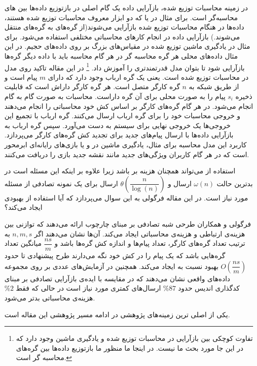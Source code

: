 \begin{enumerate}
در زمینه محاسبات توزیع شده، بازآرایی داده یک گام اصلی در بازتوزیع داده‌ها بین 
های محاسبه‌گر است. برای مثال در
یا
که دو ابزار معروف محاسبات توزیع شده هستند، داده‌ها در هنگام محاسبات توزیع شده بازآرایی می‌شوند(از گره‌های 
 به گره‌های 
 منتقل می‌شوند.) بازآرایی داده در انجام کارهای محاسباتی مختلفی استفاده می‌شود. برای مثال در یادگیری ماشین توزیع شده در مقیاس‌های بزرگ بر روی داده‌های حجیم. در این مثال داده‌های محلی هر گره محاسبه گر در هر گام محاسبه باید با داده دیگر گره‌ها بازآرایی شود تا بتوان مدل قدرتمندتری را آموزش داد.
 \footnote{
 تفاوت کوچکی بین بازآرایی در محاسبات توزیع شده و یادگیری ماشین وجود دارد که در این جا مورد بحث ما نیست. در اینجا ما منظور ما بازتوزیع داده‌ها بین گره‌های محاسبه گر است.
 }
 در این مقاله تاکید روی مدل
 در محاسبات توزیع شده است. یعنی یک گره ارباب وجود دارد که دارای
 $m$
 پیام است و از طریق شبکه به
 $n$
 گره کارگر متصل است. هر گره کارگر داراش
 است که قابلیت ذخیره
 $s_i$
پیام را به صورت محلی برای آن گره داراست. محاسبات به صورت گام به گام انجام می‌شود. در هر گام گره‌های کارگر بر اساس کش خود محاسباتی را انجام می‌دهند و خروجی محاسبات خود را برای گره ارباب ارسال می‌کنند. گره ارباب با تجمیع این خروجی‌ها یک خروجی نهایی برای سیستم به دست می‌آورد. سپس گره ارباب به بازآرایی داده‌ها با ارسال پیام‌های جدید برای تجدید کش گره‌های کارگر می‌پردازد. کاربرد این مدل محاسبه برای مثال، یادگیری ماشین در 
و یا بازی‌های رایانه‌ای ابرمحور است که در هر گام کاربران ویژگی‌های جدید مانند نقشه جدید بازی را دریافت می‌کنند.

استفاده از 
\icod
می‌تواند همچنان هزینه بر باشد زیرا علاوه بر اینکه این مسئله
\nphard
است در بدترین حالت
$\omega(n)$
ارسال و 
$\theta(\dfrac{n}{\log(n)})$
ارسال برای یک نمونه تصادفی از مسئله مورد نیاز است. در این مقاله فرگولی به این سوال می‌پردازد که آیا استفاده از 
\picod
بهبودی ایجاد می‌کند؟

فرگولی و همکاران طرحی شبه تصادفی بر مبنای چارچوب
\picod
ارائه می‌دهند که توازنی بین هزینه‌ی ارتباطی و هزینه‌ی محاسباتی ایجاد می‌کند. آن‌ها نشان می‌دهند اگر
$n, m, s$
به ترتیب تعداد گره‌های کارگر، تعداد پیام‌ها و اندازه کش گره‌ها باشد و
$\dfrac{ns}{m}$
میانگین تعداد گره‌هایی باشد که یک پیام را در کش خود نگه می‌دارند طرح پیشنهادی تا حدود
$O(\dfrac{ns}{m})$
بهبود نسبت به 
\icod
ایجاد می‌کند. همچنین در آزمایش‌های عددی بر روی مجموعه داده‌های واقعی نشان می‌دهند که در مقایسه با ایده‌‌ی بازآرایی تصادفی بر مبنای کدگذاری اندیس حدود
$\%87$
ارسال‌های کمتری مورد نیاز است در حالی که فقط
$\%2$
هزینه‌ی محاسباتی بدتر می‌شود.

یکی از اصلی ترین زمینه‌های پژوهشی در
\picod
ادامه مسیر پژوهشی این مقاله است.
	
\end{enumerate}